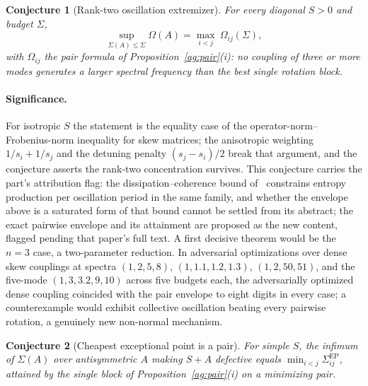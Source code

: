 \documentclass[11pt]{article}
\newtheorem{conjecture}{Conjecture}
\theoremstyle{definition}
\begin{document}
\begin{conjecture}[Rank-two oscillation extremizer]\label{ag5}
For every diagonal $S>0$ and budget $\Sigma$,
\[
\sup_{\Sigma(A)\le\Sigma}\Omega(A)=\max_{i<j}\ \Omega_{ij}(\Sigma),
\]
with $\Omega_{ij}$ the pair formula of Proposition~\ref{ag:pair}(i): no coupling of three or more modes generates a larger spectral frequency than the best single rotation block.
\end{conjecture}

\paragraph{Significance.}
For isotropic $S$ the statement is the equality case of the operator-norm--Frobenius-norm inequality for skew matrices; the anisotropic weighting $1/s_i+1/s_j$ and the detuning penalty $(s_j-s_i)/2$ break that argument, and the conjecture asserts the rank-two concentration survives.  This conjecture carries the part's attribution flag: the dissipation--coherence bound of~\cite{NKI26} constrains entropy production per oscillation period in the same family, and whether the envelope above is a saturated form of that bound cannot be settled from its abstract; the exact pairwise envelope and its attainment are proposed as the new content, flagged pending that paper's full text.  A first decisive theorem would be the $n=3$ case, a two-parameter reduction.  In adversarial optimizations over dense skew couplings at spectra $(1,2,5,8)$, $(1,1.1,1.2,1.3)$, $(1,2,50,51)$, and the five-mode $(1,3,3.2,9,10)$ across five budgets each, the adversarially optimized dense coupling coincided with the pair envelope to eight digits in every case; a counterexample would exhibit collective oscillation beating every pairwise rotation, a genuinely new non-normal mechanism.

\begin{conjecture}[Cheapest exceptional point is a pair]\label{ag6}
For simple $S$, the infimum of $\Sigma(A)$ over antisymmetric $A$ making $S+A$ defective equals $\min_{i<j}\Sigma_{ij}^{\mathrm{EP}}$, attained by the single block of Proposition~\ref{ag:pair}(i) on a minimizing pair.
\end{conjecture}
\end{document}
